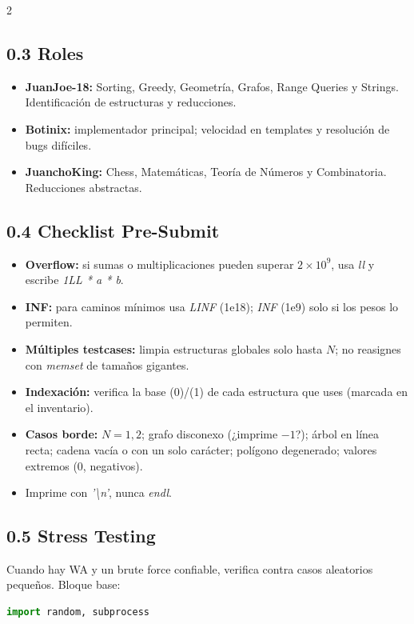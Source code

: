 \documentclass[10pt]{article}
\begin{document}
\begin{multicols}{2}
\subsection*{0.3 Roles}
\begin{itemize}\setlength{\itemsep}{1pt}
  \item \textbf{JuanJoe-18:} Sorting, Greedy, Geometría, Grafos, Range Queries y Strings. Identificación de estructuras y reducciones.
  \item \textbf{Botinix:} implementador principal; velocidad en templates y resolución de bugs difíciles.
  \item \textbf{JuanchoKing:} Chess, Matemáticas, Teoría de Números y Combinatoria. Reducciones abstractas.
\end{itemize}

\subsection*{0.4 Checklist Pre-Submit}
\begin{itemize}\setlength{\itemsep}{1pt}
  \item \textbf{Overflow:} si sumas o multiplicaciones pueden superar $2\times 10^9$, usa \textit{ll} y escribe \textit{1LL * a * b}.
  \item \textbf{INF:} para caminos mínimos usa \textit{LINF} (1e18); \textit{INF} (1e9) solo si los pesos lo permiten.
  \item \textbf{Múltiples testcases:} limpia estructuras globales solo hasta $N$; no reasignes con \textit{memset} de tamaños gigantes.
  \item \textbf{Indexación:} verifica la base (0)/(1) de cada estructura que uses (marcada en el inventario).
  \item \textbf{Casos borde:} $N=1,2$; grafo disconexo (¿imprime $-1$?); árbol en línea recta; cadena vacía o con un solo carácter; polígono degenerado; valores extremos (0, negativos).
  \item Imprime con \textit{'\textbackslash n'}, nunca \textit{endl}.
\end{itemize}

\subsection*{0.5 Stress Testing}
Cuando hay WA y un brute force confiable, verifica contra casos aleatorios pequeños. Bloque base:

\begin{lstlisting}[language=Python]
import random, subprocess


\end{lstlisting}
\end{multicols}
\end{document}

